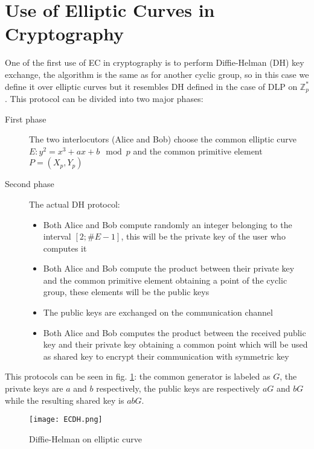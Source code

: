\documentclass{article}
\begin{document}

\section{Use of Elliptic Curves in Cryptography}
\label{sec:use}

One of the first use of EC in cryptography is to perform Diffie-Helman (DH) key exchange, the algorithm is the same as for another cyclic group, so in this case we define it over elliptic curves but it resembles DH defined in the case of DLP on $\mathbb{Z}_p^*$.\newline
This protocol can be divided into two major phases:
\begin{description}
	\item[First phase  ] The two interlocutors (Alice and Bob) choose the common elliptic curve $E: y^2 = x^3 + ax+ b \mod p$ and the common primitive element $P = (X_p, Y_p)$
	\item[Second phase] The actual DH protocol: 
	\begin{itemize}
		\item Both Alice and Bob compute randomly an integer belonging to the interval $[2; \#E-1]$, this will be the private key of the user who computes it
		\item Both Alice and Bob compute the product between their private key and the common primitive element obtaining a point of the cyclic group, these elements will be the public keys
		\item The public keys are exchanged on the communication channel
		\item Both Alice and Bob computes the product between the received public key and their private key obtaining a common point which will be used as shared key to encrypt their communication with symmetric key 
	\end{itemize}
\end{description} 

This protocols can be seen in fig. \ref{fig:ECDH}: the common generator is labeled as $G$, the private keys are $a$ and $b$ respectively, the public keys are respectively $aG$ and $bG$ while the resulting shared key is $abG$.

\begin{figure}[H]
	\centering
	\texttt{[image: ECDH.png]}
	\caption{Diffie-Helman on elliptic curve \cite{ECDH}}
	\label{fig:ECDH}
\end{figure}
\end{document}
